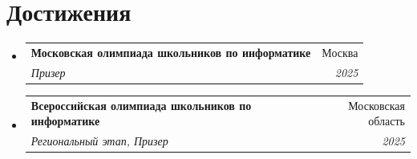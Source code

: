 \documentclass[letterpaper,11pt]{article}
\makeatletter
\newcommand{\resumeSubheading}[4]{
  \vspace{-2pt}\item
    \begin{tabular*}{0.97\textwidth}[t]{l@{\extracolsep{\fill}}r}
      \textbf{#1} & #2 \\
      \textit{\small#3} & \textit{\small #4} \\
    \end{tabular*}\vspace{-7pt}
}
\newcommand{\resumeSubHeadingListStart}{\begin{itemize}[leftmargin=0.15in, label={}]}
\newcommand{\resumeSubHeadingListEnd}{\end{itemize}}
\makeatother
\begin{document}
\section{Достижения}

  \resumeSubHeadingListStart
    \resumeSubheading
      {Московская олимпиада школьников по информатике}{Москва}
      {Призер}{2025}
    \resumeSubheading
      {Всероссийская олимпиада школьников по информатике}{Московская область}
      {Региональный этап, Призер}{2025}
    \resumeSubHeadingListEnd
\end{document}
